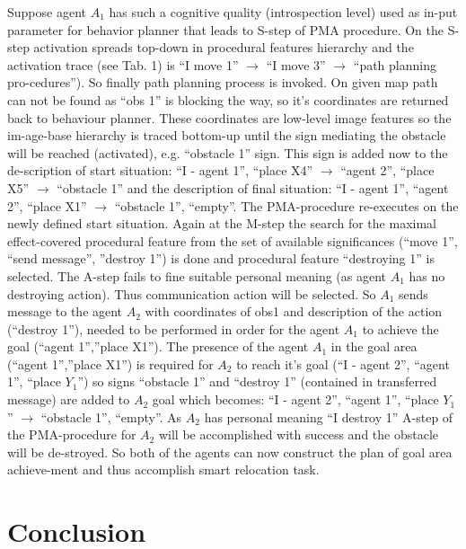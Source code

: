 \documentclass[runningheads,a4paper]{llncs}
\begin{document}
Suppose agent $A_1$ has such a cognitive quality (introspection level) used as in-put parameter for behavior planner that leads to S-step of PMA procedure. On the S-step activation spreads top-down in procedural features hierarchy  and the activation trace (see Tab. 1) is ``I move 1'' $\rightarrow$ ``I move 3'' $\rightarrow$ ``path planning pro-cedures''). So finally path planning process is invoked. On given map path can not be found as ``obs 1'' is blocking the way, so it’s coordinates are returned back to behaviour planner. These coordinates are low-level image features so the im-age-base hierarchy is traced bottom-up until the sign mediating the obstacle will be reached (activated), e.g. ``obstacle 1'' sign. This sign is added now to the de-scription of start situation: ``I - agent 1'', ``place X4'' $\rightarrow$  ``agent 2'', ``place X5'' $\rightarrow$ ``obstacle 1'' and the description of final situation: ``I - agent 1'', ``agent 2'', ``place X1'' $\rightarrow$ ``obstacle 1'', ``empty''. The PMA-procedure re-executes on the newly defined start situation. Again at the M-step the search for the maximal effect-covered procedural feature from the set of available significances (``move 1'', ``send message'', ''destroy 1'') is done and procedural feature ``destroying 1'' is selected. The A-step fails to fine suitable personal meaning (as agent $A_1$ has no destroying action). Thus communication action will be selected. So $A_1$ sends message to the agent $A_2$ with coordinates of obs1 and description of the action (``destroy 1''), needed to be performed in order for the agent $A_1$ to achieve the goal (``agent 1'',''place X1''). The presence of the agent $A_1$ in the goal area (``agent 1'',''place X1'') is required for $A_2$ to reach it’s goal (``I - agent 2'', ``agent 1'', ``place $Y_1$'') so signs ``obstacle 1'' and ``destroy 1'' (contained in transferred message) are added to $A_2$ goal which becomes: ``I - agent 2'', ``agent 1'', ``place $Y_1$'' $\rightarrow$ ``obstacle 1'', ``empty''. As $A_2$ has personal meaning ``I destroy 1'' A-step of the PMA-procedure for $A_2$ will be accomplished with success and the obstacle will be de-stroyed. So both of the agents can now construct the plan of goal area achieve-ment and thus accomplish smart relocation task.

\section{Conclusion}
\end{document}
